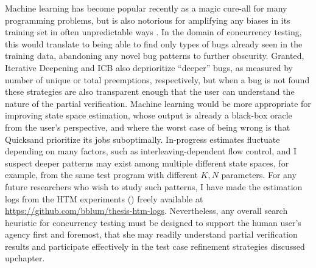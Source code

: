 Machine learning has become popular recently as a magic cure-all for many programming problems,
but is also notorious for amplifying any biases in its training set in often unpredictable ways
\cite{conceptnet-bias,amazon-ai}.
In the domain of concurrency testing, this would translate to being able to find only types of bugs
already seen in the training data, abandoning any novel bug patterns to further obscurity.
Granted,
Iterative Deepening and
ICB also deprioritize ``deeper'' bugs,
as measured by number of unique or total preemptions, respectively,
but when a bug is not found
these strategies are also transparent enough that the user can understand the nature of the partial verification.
%
Machine learning would be more appropriate for improving state space estimation,
whose output is already a black-box oracle from the user's perspective,
and where the worst case of being wrong
is that Quicksand prioritize its jobs suboptimally. %
In-progress estimates fluctuate depending on many factors,
such as interleaving-dependent flow control,
and I suspect deeper patterns may exist among multiple different state spaces,
for example,
from the same test program with different $K,N$ parameters.
For any future researchers who wish to study such patterns,
I have made the estimation logs from the HTM experiments (\sect{\ref{sec:tm-eval}})
freely available at \url{https://github.com/bblum/thesis-htm-logs}.
%
Nevertheless,
any overall search heuristic for concurrency testing
must be designed to support the human user's agency first and foremost,
that she may readily understand partial verification results
and participate effectively in the test case refinement strategies discussed
upchapter. %




